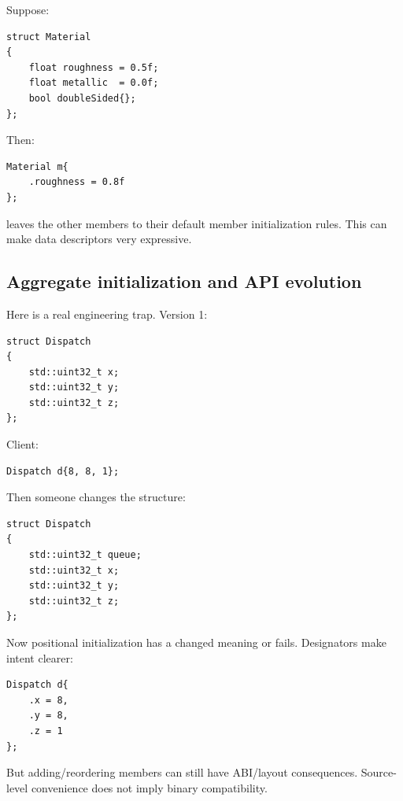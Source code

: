 \hypertarget{05-engine-i-ch003-missing-members}{}

Suppose:

\begin{verbatim}
struct Material
{
    float roughness = 0.5f;
    float metallic  = 0.0f;
    bool doubleSided{};
};
\end{verbatim}

Then:

\begin{verbatim}
Material m{
    .roughness = 0.8f
};
\end{verbatim}

leaves the other members to their default member initialization rules. This can make data descriptors very expressive.

\subsection{Aggregate initialization and API evolution}\label{05-engine-i-ch003-aggregate-initialization-and-api-evolution}

\hypertarget{05-engine-i-ch003-aggregate-initialization-and-api-evolution}{}

Here is a real engineering trap. Version 1:

\begin{verbatim}
struct Dispatch
{
    std::uint32_t x;
    std::uint32_t y;
    std::uint32_t z;
};
\end{verbatim}

Client:

\begin{verbatim}
Dispatch d{8, 8, 1};
\end{verbatim}

Then someone changes the structure:

\begin{verbatim}
struct Dispatch
{
    std::uint32_t queue;
    std::uint32_t x;
    std::uint32_t y;
    std::uint32_t z;
};
\end{verbatim}

Now positional initialization has a changed meaning or fails. Designators make intent clearer:

\begin{verbatim}
Dispatch d{
    .x = 8,
    .y = 8,
    .z = 1
};
\end{verbatim}

But adding/reordering members can still have ABI/layout consequences. Source-level convenience does not imply binary compatibility.

